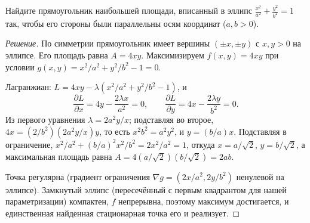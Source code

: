 \begin{problem}
\label{prob:rectangle-ellipse}
Найдите прямоугольник наибольшей площади, вписанный в эллипс
$\frac{x^2}{a^2} + \frac{y^2}{b^2} = 1$ так, чтобы его стороны были
параллельны осям координат ($a, b > 0$).
\end{problem}

\begin{proof}[Решение]
По симметрии прямоугольник имеет вершины $(\pm x, \pm y)$ с $x, y > 0$
на эллипсе. Его площадь равна $A = 4xy$. Максимизируем
$f(x, y) = 4xy$ при условии
$g(x, y) = x^2/a^2 + y^2/b^2 - 1 = 0$.

Лагранжиан: $L = 4xy - \lambda(x^2/a^2 + y^2/b^2 - 1)$, и
\[
  \frac{\partial L}{\partial x} = 4y - \frac{2\lambda x}{a^2} = 0,
  \qquad
  \frac{\partial L}{\partial y} = 4x - \frac{2\lambda y}{b^2} = 0.
\]
Из первого уравнения $\lambda = 2 a^2 y / x$; подставляя во второе,
$4x = (2/b^2)(2 a^2 y / x) y$, то есть $x^2 b^2 = a^2 y^2$, и
$y = (b/a) x$. Подставляя в ограничение,
$x^2/a^2 + (b/a)^2 x^2 / b^2 = 2 x^2 / a^2 = 1$, откуда
$x = a/\sqrt{2}$, $y = b/\sqrt{2}$, а максимальная площадь равна
$A = 4 (a/\sqrt{2})(b/\sqrt{2}) = 2 a b$.

Точка регулярна (градиент ограничения
$\nabla g = (2x/a^2, 2y/b^2)$ ненулевой на эллипсе). Замкнутый эллипс
(пересечённый с первым квадрантом для нашей параметризации) компактен,
$f$ непрерывна, поэтому максимум достигается, и единственная найденная
стационарная точка его и реализует.
\end{proof}
